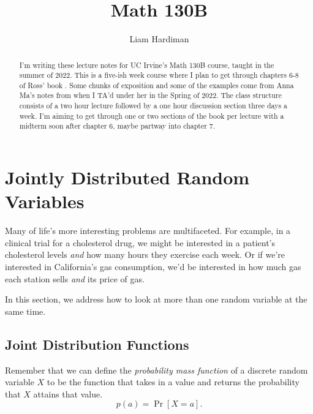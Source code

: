 \documentclass[12pt]{article}
\theoremstyle{plain}
\theoremstyle{definition}
\theoremstyle{remark}
\begin{document}
 
 
\title{Math 130B}
\author{Liam Hardiman}

\maketitle

\begin{abstract}
    I'm writing these lecture notes for UC Irvine's Math 130B course, taught in the summer of 2022.
    This is a five-ish week course where I plan to get through chapters 6-8 of Ross' book \cite{Ross}.
    Some chunks of exposition and some of the examples come from Anna Ma's notes from when I TA'd under her in the Spring of 2022.
    The class structure consists of a two hour lecture followed by a one hour discussion section three days a week.
    I'm aiming to get through one or two sections of the book per lecture with a midterm soon after chapter 6, maybe partway into chapter 7.

\end{abstract}


\tableofcontents


\section{Jointly Distributed Random Variables}
Many of life's more interesting problems are multifaceted.
For example, in a clinical trial for a cholesterol drug, we might be interested in a patient's cholesterol levels \emph{and} how many hours they exercise each week.
Or if we're interested in California's gas consumption, we'd be interested in how much gas each station sells \emph{and} its price of gas.

In this section, we address how to look at more than one random variable at the same time.


\subsection{Joint Distribution Functions}

Remember that we can define the \emph{probability mass function} of a discrete random variable $X$ to be the function that takes in a value and returns the probability that $X$ attains that value.
\[
    p(a) = \Pr[X = a].
\]
\end{document}
